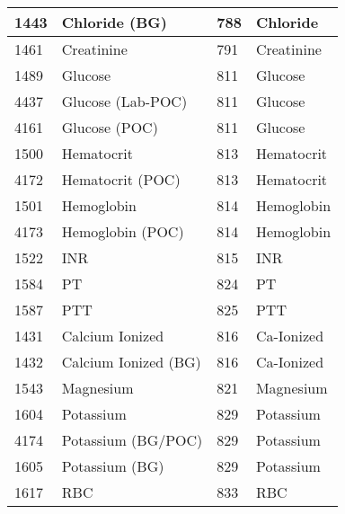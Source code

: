 \documentclass[
   technote
]{phildoc}
\begin{document}
\begin{table}[h!]
\begin{tabular}{l|l|l|l}
	\hline
	1443 & Chloride (BG) & 788 & Chloride \\
	\hline
	1461 & Creatinine & 791 & Creatinine \\
	\hline
	1489 & Glucose & 811 & Glucose \\
	\hline
	4437 & Glucose (Lab-POC) & 811 & Glucose \\
	\hline
	4161 & Glucose (POC) & 811 & Glucose \\
	\hline
	1500 & Hematocrit & 813 & Hematocrit \\
	\hline
	4172 & Hematocrit (POC) & 813 & Hematocrit \\
	\hline
	1501 & Hemoglobin & 814 & Hemoglobin \\
	\hline
	4173 & Hemoglobin (POC) & 814 & Hemoglobin \\
	\hline
	1522 & INR & 815 & INR \\
	\hline
	1584 & PT & 824 & PT \\
	\hline
	1587 & PTT & 825 & PTT \\
	\hline
	1431 & Calcium Ionized & 816 & Ca-Ionized \\
	\hline
	1432 & Calcium Ionized (BG) & 816 &	Ca-Ionized \\
	\hline
	1543 & Magnesium & 821 & Magnesium \\
	\hline
	1604 & Potassium & 829 & Potassium \\
	\hline
	4174 & Potassium (BG/POC) & 829 & Potassium \\
	\hline
	1605 & Potassium (BG) & 829 & Potassium \\
	\hline
	1617 & RBC & 833 & RBC \\
	\hline
	\hline
\end{tabular}
\end{table}
\end{document}
